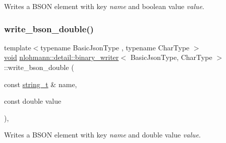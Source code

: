 Writes a B\+S\+ON element with key {\itshape name} and boolean value {\itshape value}. 

\mbox{\label{classnlohmann_1_1detail_1_1binary__writer_a263ec18815467bb9919021ef126919ca}} 
\subsubsection{\texorpdfstring{write\+\_\+bson\+\_\+double()}{write\_bson\_double()}}
{\footnotesize\ttfamily template$<$typename Basic\+Json\+Type , typename Char\+Type $>$ \\
\hyperlink{namespacenlohmann_1_1detail_a59fca69799f6b9e366710cb9043aa77d}{void} \hyperlink{classnlohmann_1_1detail_1_1binary__writer}{nlohmann\+::detail\+::binary\+\_\+writer}$<$ Basic\+Json\+Type, Char\+Type $>$\+::write\+\_\+bson\+\_\+double (\begin{DoxyParamCaption}\item[{const \hyperlink{classnlohmann_1_1detail_1_1binary__writer_a29f2ae7a5c4a8c1dae47b3b2310de8a8}{string\+\_\+t} \&}]{name,  }\item[{const double}]{value }\end{DoxyParamCaption})\hspace{0.3cm}{\ttfamily [inline]}, {\ttfamily [private]}}



Writes a B\+S\+ON element with key {\itshape name} and double value {\itshape value}. 

\mbox{\label{classnlohmann_1_1detail_1_1binary__writer_a7ff58bf1a80018148bed860667ffca07}} 
